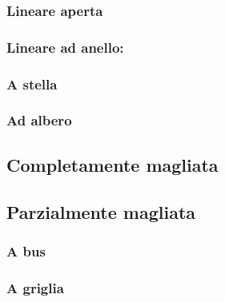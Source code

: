         \subsubsection{Lineare aperta}
            

        \subsubsection{Lineare ad anello:}
            

        \subsubsection{A stella}
            

        \subsubsection{Ad albero}
            

        \subsection{Completamente magliata}
            

        \subsection{Parzialmente magliata}
            

        \subsubsection{A bus}
            

        \subsubsection{A griglia}
            

    \newpage

